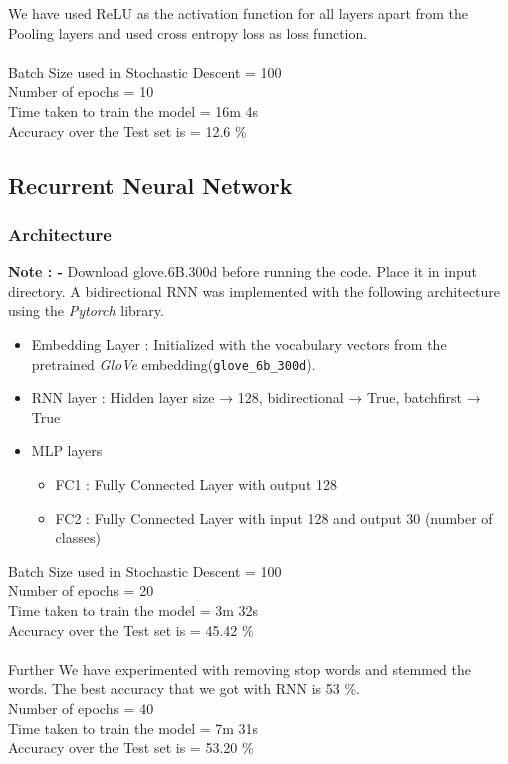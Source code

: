 \documentclass[11pt]{article}
\begin{document}
We have used ReLU as the activation function for all layers apart from the Pooling layers and used cross entropy loss as loss function. \\
\\
Batch Size used in Stochastic Descent = 100 \\
Number of epochs = 10 \\
Time taken to train the model = 16m 4s \\
Accuracy over the Test set is = 12.6 \%

\subsection{Recurrent Neural Network}
\subsubsection{Architecture}

\textbf{Note : -}  Download glove.6B.300d before running the code. Place it in input directory.
A bidirectional RNN was implemented with the following architecture using the \textit{Pytorch} library.
\begin{itemize}
    \item Embedding Layer : Initialized with the vocabulary vectors from the pretrained \textit{GloVe} embedding(\texttt{glove\_6b\_300d}).
\item RNN layer : Hidden layer size → 128, bidirectional → True, batchfirst → True
\item MLP layers
\begin{itemize}
    \item FC1 : Fully Connected Layer with output 128
    \item FC2 : Fully Connected Layer with input 128 and output 30 (number of classes)
\end{itemize}
\end{itemize}
Batch Size used in Stochastic Descent = 100 \\
Number of epochs = 20 \\
Time taken to train the model = 3m 32s \\
Accuracy over the Test set is = 45.42 \%\\
\\
Further We have experimented with removing stop words and stemmed the words. The best accuracy that we got with RNN is 53 \%.\\
Number of epochs = 40 \\
Time taken to train the model = 7m 31s \\
Accuracy over the Test set is = 53.20 \%
\end{document}
